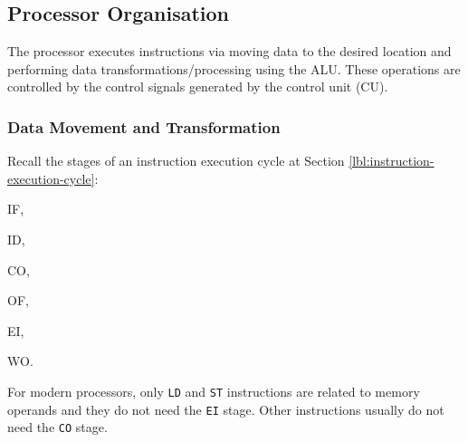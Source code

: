 \subsection{Processor Organisation}

The processor executes instructions via moving data to the desired location and
performing data transformations/processing using the ALU. These operations are
controlled by the control signals generated by the control unit (CU).

\subsubsection{Data Movement and Transformation}

Recall the stages of an instruction execution cycle at Section \ref{lbl:instruction-execution-cycle}:
\begin{enumerate*}[label=\textbf{(\arabic*)}]
    \item IF, \item ID, \item CO, \item OF, \item EI, \item WO.
\end{enumerate*}
For modern processors, only \texttt{LD} and \texttt{ST} instructions are related to memory operands
and they do not need the \texttt{EI} stage. Other instructions usually do not need the \texttt{CO} stage.

